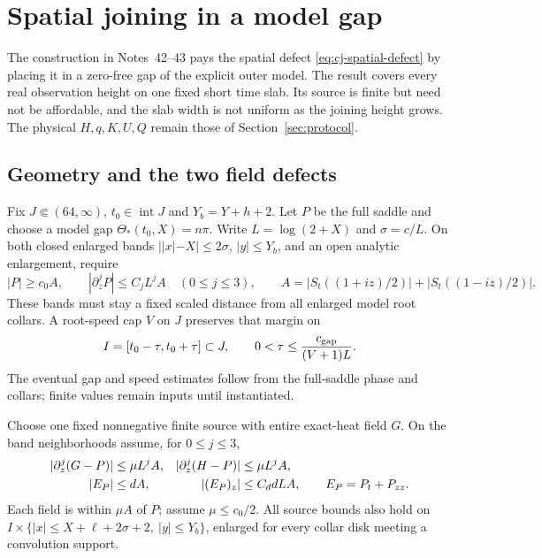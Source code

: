 \section{Spatial joining in a model gap}\label{sec:spatial-join}
The construction in Notes~42--43 \cite{n42,n43} pays the spatial defect
\eqref{eq:cj-spatial-defect} by placing it in a zero-free gap of the
explicit outer model. The result covers every real observation height
on one fixed short time slab. Its source is finite but need not be
affordable, and the slab width is not uniform as the joining height grows.
The physical $H,q,K,U,Q$ remain those of Section~\ref{sec:protocol}.

\subsection{Geometry and the two field defects}
Fix $J\Subset(64,\infty)$, $t_0\in\operatorname{int}J$ and
$Y_b=Y+h+2$. Let $P$ be the full saddle and choose a model gap
$\Theta_*(t_0,X)=n\pi$. Write $L=\log(2+X)$ and $\sigma=c/L$.
On both closed enlarged bands $||x|-X|\le2\sigma$, $|y|\le Y_b$,
and an open analytic enlargement, require
\begin{equation}
 |P|\ge c_0 A,\qquad |\partial_z^jP|\le C_jL^j A\quad(0\le j\le3),
 \qquad A=|S_t((1+iz)/2)|+|S_t((1-iz)/2)|.
 \label{eq:sj-gap}
\end{equation}
These bands must stay a fixed scaled distance from all enlarged model
root collars. A root-speed cap $V$ on $J$ preserves that margin on
\begin{equation}
 I=[t_0-\tau,t_0+\tau]\subset J,\qquad
 0<\tau\le \frac{c_{\rm gap}}{(V+1)L}.
 \label{eq:sj-time}
\end{equation}
The eventual gap and speed estimates follow from the full-saddle phase
and collars; finite values remain inputs until instantiated.

Choose one fixed nonnegative finite source with entire exact-heat field
$G$. On the band neighborhoods assume, for $0\le j\le3$,
\begin{align}
 |\partial_z^j(G-P)|&\le\mu L^j A,&
 |\partial_z^j(H-P)|&\le\mu L^j A,\notag\\
 |E_P|&\le dA,&|(E_P)_z|&\le C_d dLA,
 \qquad E_P=P_t+P_{zz}.
 \label{eq:sj-input}
\end{align}
Each field is within
$\mu A$ of $P$; assume $\mu\le c_0/2$. All source bounds also hold on
$I\times\{|x|\le X+\ell+2\sigma+2,\ |y|\le Y_b\}$, enlarged for
every collar disk meeting a convolution support.


